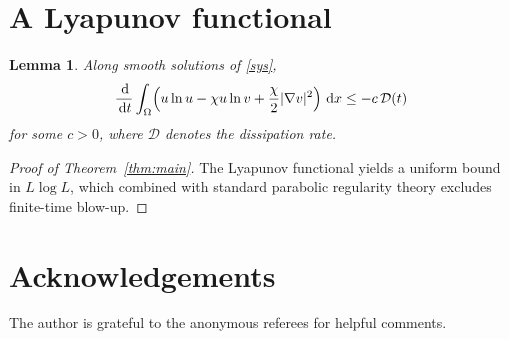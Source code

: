 \documentclass[preprint,12pt]{elsarticle}
\newtheorem{lemma}[theorem]{Lemma}
\theoremstyle{definition}
\newcommand{\Om}{\Omega}
\newcommand{\dd}{\,\mathrm{d}}
\begin{document}
\section{A Lyapunov functional}

\begin{lemma}
Along smooth solutions of \eqref{sys},
\begin{equation}
  \frac{\dd}{\dd t}\int_\Om\Bigl(u\ln u - \chi u\ln v
  + \frac{\chi}{2}|\nabla v|^2\Bigr)\,\dd x \le -c\,\mathcal{D}(t)
\end{equation}
for some $c>0$, where $\mathcal{D}$ denotes the dissipation rate.
\end{lemma}

\begin{proof}[Proof of Theorem~\ref{thm:main}]
The Lyapunov functional yields a uniform bound in $L\log L$, which
combined with standard parabolic regularity theory excludes finite-time
blow-up.
\end{proof}

\section*{Acknowledgements}
The author is grateful to the anonymous referees for helpful comments.
\end{document}
